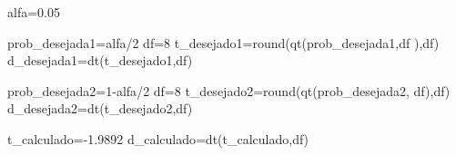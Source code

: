 \documentclass[
]{book}
\newenvironment{Shaded}{\begin{snugshade}}{\end{snugshade}}
\newcommand{\DecValTok}[1]{\textcolor[rgb]{0.00,0.00,0.81}{#1}}
\newcommand{\FloatTok}[1]{\textcolor[rgb]{0.00,0.00,0.81}{#1}}
\newcommand{\FunctionTok}[1]{\textcolor[rgb]{0.00,0.00,0.00}{#1}}
\newcommand{\NormalTok}[1]{#1}
\newcommand{\OtherTok}[1]{\textcolor[rgb]{0.56,0.35,0.01}{#1}}
\newcommand{\SpecialCharTok}[1]{\textcolor[rgb]{0.00,0.00,0.00}{#1}}
\begin{document}
\begin{Shaded}
\begin{Highlighting}[]
\NormalTok{alfa}\OtherTok{=}\FloatTok{0.05}

\NormalTok{prob\_desejada1}\OtherTok{=}\NormalTok{alfa}\SpecialCharTok{/}\DecValTok{2}
\NormalTok{df}\OtherTok{=}\DecValTok{8}
\NormalTok{t\_desejado1}\OtherTok{=}\FunctionTok{round}\NormalTok{(}\FunctionTok{qt}\NormalTok{(prob\_desejada1,df ),df)}
\NormalTok{d\_desejada1}\OtherTok{=}\FunctionTok{dt}\NormalTok{(t\_desejado1,df)}

\NormalTok{prob\_desejada2}\OtherTok{=}\DecValTok{1}\SpecialCharTok{{-}}\NormalTok{alfa}\SpecialCharTok{/}\DecValTok{2}
\NormalTok{df}\OtherTok{=}\DecValTok{8}
\NormalTok{t\_desejado2}\OtherTok{=}\FunctionTok{round}\NormalTok{(}\FunctionTok{qt}\NormalTok{(prob\_desejada2, df),df)}
\NormalTok{d\_desejada2}\OtherTok{=}\FunctionTok{dt}\NormalTok{(t\_desejado2,df)}

\NormalTok{t\_calculado}\OtherTok{=}\SpecialCharTok{{-}}\FloatTok{1.9892}
\NormalTok{d\_calculado}\OtherTok{=}\FunctionTok{dt}\NormalTok{(t\_calculado,df)}



\end{Highlighting}
\end{Shaded}
\end{document}
